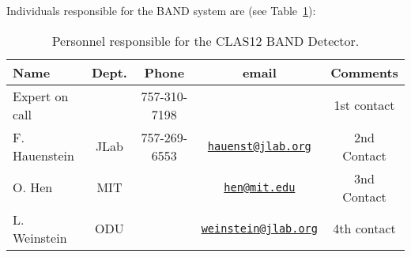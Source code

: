 Individuals responsible for the BAND system are (see Table~\ref{tb:band}):

\begin{table}[!htb]
 \centering
 \begin{tabular}{|l|c|c|c|c|}
\hline
 Name           & Dept.    & Phone        & email                    & Comments \\ \hline
Expert on call  &          & 757-310-7198 &                          & 1st contact \\ \hline
F. Hauenstein   & JLab     & 757-269-6553 & \href{mailto:hauenst@jlab.org}{\nolinkurl{hauenst@jlab.org}}     & 2nd Contact \\ \hline
O. Hen          & MIT      &              & \href{mailto:hen@mit.edu}{\nolinkurl{hen@mit.edu}}               & 3nd Contact \\ \hline
L. Weinstein    & ODU      &              & \href{mailto:weinstein@jlab.org}{\nolinkurl{weinstein@jlab.org}} & 4th contact  \\ \hline
 \end{tabular}
\caption{Personnel responsible for the CLAS12 BAND Detector.} 
\label{tb:band}
\end{table}

